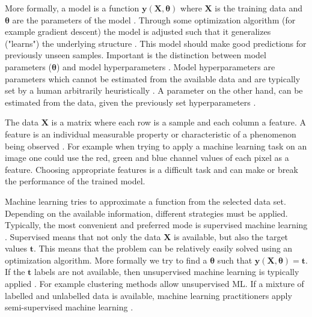 \documentclass[draft,final,oneside]{vutinfth} %
\begin{document}
More formally, a model is a function $\boldsymbol{y}(\boldsymbol{X}, \boldsymbol{\theta})$ where $\boldsymbol{X}$ is the training data and $\boldsymbol{\theta}$ are the parameters of the model \cite{bishop}. Through some optimization algorithm (for example gradient descent) the model is adjusted such that it generalizes ("learns") the underlying structure \cite{anintroductiontoneuralnetworks}. This model should make good predictions for previously unseen samples. Important is the distinction between model parameters ($\boldsymbol{\theta}$) and model hyperparameters \cite{aimodern}. Model hyperparameters are parameters which cannot be estimated from the available data and are typically set by a human arbitrarily heuristically \cite{hyperparameter}. A parameter on the other hand, can be estimated from the data, given the previously set hyperparameters \cite{anintroductiontoneuralnetworks}.

The data $\boldsymbol{X}$ is a matrix where each row is a sample and each column a feature. A feature is an individual measurable property or characteristic of a phenomenon being observed \cite{bishop}. For example when trying to apply a machine learning task on an image one could use the red, green and blue channel values of each pixel as a feature. Choosing appropriate features is a difficult task and can make or break the performance of the trained model.

Machine learning tries to approximate a function from the selected data set. Depending on the available information, different strategies must be applied. Typically, the most convenient and preferred mode is supervised machine learning \cite{aimodern}. Supervised means that not only the data $\boldsymbol{X}$ is available, but also the target values $\boldsymbol{t}$. This means that the problem can be relatively easily solved using an optimization algorithm. More formally we try to find a $\boldsymbol{\theta}$ such that $\boldsymbol{y}(\boldsymbol{X}, \boldsymbol{\theta}) = \boldsymbol{t}$. If the $\boldsymbol{t}$ labels are not available, then unsupervised machine learning is typically applied \cite{aimodern}. For example clustering methods allow unsupervised ML. If a mixture of labelled and unlabelled data is available, machine learning practitioners apply semi-supervised machine learning \cite{semisupervised}.
\end{document}

